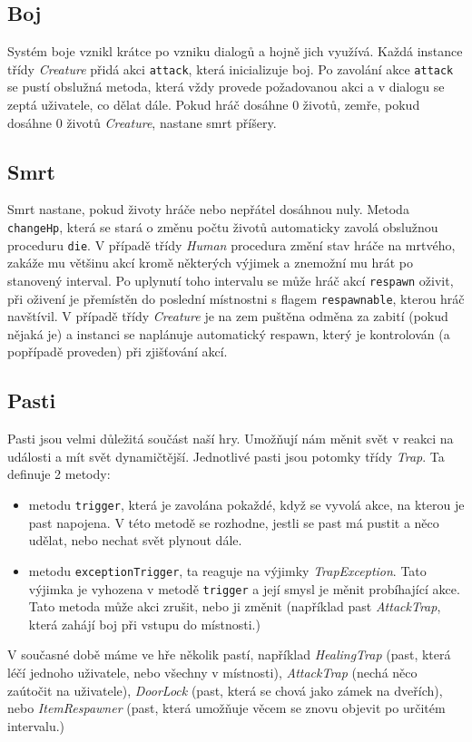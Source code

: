 \documentclass[11pt, a4paper]{article}
\def\class#1{\emph{#1}}
\begin{document}
\subsection{Boj}
\label{combat}
Systém boje vznikl krátce po vzniku dialogů a hojně jich využívá. Každá instance třídy \class{Creature} přidá akci \texttt{attack}, která inicializuje boj. Po zavolání akce \texttt{attack} se pustí obslužná metoda, která vždy provede požadovanou akci a v dialogu se zeptá uživatele, co dělat dále. Pokud hráč dosáhne 0 životů, zemře, pokud dosáhne 0 životů \class{Creature}, nastane smrt příšery.

\subsection{Smrt}

Smrt nastane, pokud životy hráče nebo nepřátel dosáhnou nuly. Metoda \texttt{changeHp}, která se stará o změnu počtu životů automaticky zavolá obslužnou proceduru \texttt{die}. V případě třídy \class{Human} procedura změní stav hráče na mrtvého, zakáže mu většinu akcí kromě některých výjimek a znemožní mu hrát po stanovený interval. Po uplynutí toho intervalu se může hráč akcí \texttt{respawn} oživit, při oživení je přemístěn do poslední místnostni s flagem \texttt{respawnable}, kterou hráč navštívil. V případě třídy \class{Creature} je na zem puštěna odměna za zabití (pokud nějaká je) a instanci se naplánuje automatický respawn, který je kontrolován (a popřípadě proveden) při zjišťování akcí.

\subsection{Pasti}

Pasti jsou velmi důležitá součást naší hry. Umožňují nám měnit svět v reakci na události a mít svět dynamičtější. Jednotlivé pasti jsou potomky třídy \class{Trap}. Ta definuje 2 metody:
\begin{itemize}
\item metodu \texttt{trigger}, která je zavolána pokaždé, když se vyvolá akce, na kterou je past napojena. V této metodě se rozhodne, jestli se past má pustit a něco udělat, nebo nechat svět plynout dále.
\item metodu \texttt{exceptionTrigger}, ta reaguje na výjimky \class{TrapException}. Tato výjimka je vyhozena v metodě \texttt{trigger} a její smysl je měnit probíhající akce. Tato metoda může akci zrušit, nebo ji změnit (například past \class{AttackTrap}, která zahájí boj při vstupu do místnosti.)
\end{itemize}
V současné době máme ve hře několik pastí, například \class{HealingTrap} (past, která léčí jednoho uživatele, nebo všechny v místnosti), \class{AttackTrap} (nechá něco zaútočit na uživatele), \class{DoorLock} (past, která se chová jako zámek na dveřích), nebo \class{ItemRespawner} (past, která umožňuje věcem se znovu objevit po určitém intervalu.)
\end{document}
